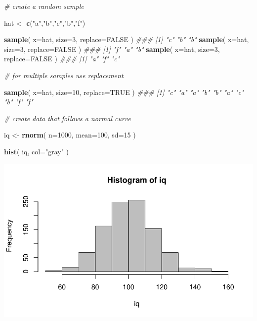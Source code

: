 \documentclass[]{book}
\newenvironment{Shaded}{\begin{snugshade}}{\end{snugshade}}
\newcommand{\CommentTok}[1]{\textcolor[rgb]{0.56,0.35,0.01}{\textit{#1}}}
\newcommand{\DataTypeTok}[1]{\textcolor[rgb]{0.13,0.29,0.53}{#1}}
\newcommand{\DecValTok}[1]{\textcolor[rgb]{0.00,0.00,0.81}{#1}}
\newcommand{\KeywordTok}[1]{\textcolor[rgb]{0.13,0.29,0.53}{\textbf{#1}}}
\newcommand{\NormalTok}[1]{#1}
\newcommand{\OtherTok}[1]{\textcolor[rgb]{0.56,0.35,0.01}{#1}}
\newcommand{\StringTok}[1]{\textcolor[rgb]{0.31,0.60,0.02}{#1}}
\theoremstyle{definition}
\theoremstyle{definition}
\theoremstyle{definition}
\theoremstyle{remark}
\begin{document}
\begin{Shaded}
\begin{Highlighting}[]
\CommentTok{# create a random sample}

\NormalTok{hat <-}\StringTok{ }\KeywordTok{c}\NormalTok{(}\StringTok{"a"}\NormalTok{,}\StringTok{"b"}\NormalTok{,}\StringTok{"c"}\NormalTok{,}\StringTok{"b"}\NormalTok{,}\StringTok{"f"}\NormalTok{)}

\KeywordTok{sample}\NormalTok{( }\DataTypeTok{x=}\NormalTok{hat, }\DataTypeTok{size=}\DecValTok{3}\NormalTok{, }\DataTypeTok{replace=}\OtherTok{FALSE}\NormalTok{ )}
\CommentTok{### [1] "c" "b" "b"}
\KeywordTok{sample}\NormalTok{( }\DataTypeTok{x=}\NormalTok{hat, }\DataTypeTok{size=}\DecValTok{3}\NormalTok{, }\DataTypeTok{replace=}\OtherTok{FALSE}\NormalTok{ )}
\CommentTok{### [1] "f" "a" "b"}
\KeywordTok{sample}\NormalTok{( }\DataTypeTok{x=}\NormalTok{hat, }\DataTypeTok{size=}\DecValTok{3}\NormalTok{, }\DataTypeTok{replace=}\OtherTok{FALSE}\NormalTok{ )}
\CommentTok{### [1] "a" "f" "c"}

\CommentTok{# for multiple samples use replacement}

\KeywordTok{sample}\NormalTok{( }\DataTypeTok{x=}\NormalTok{hat, }\DataTypeTok{size=}\DecValTok{10}\NormalTok{, }\DataTypeTok{replace=}\OtherTok{TRUE}\NormalTok{ )}
\CommentTok{###  [1] "c" "a" "a" "b" "b" "a" "c" "b" "f" "f"}





\CommentTok{# create data that follows a normal curve}

\NormalTok{iq <-}\StringTok{ }\KeywordTok{rnorm}\NormalTok{( }\DataTypeTok{n=}\DecValTok{1000}\NormalTok{, }\DataTypeTok{mean=}\DecValTok{100}\NormalTok{, }\DataTypeTok{sd=}\DecValTok{15}\NormalTok{ )}

\KeywordTok{hist}\NormalTok{( iq, }\DataTypeTok{col=}\StringTok{"gray"}\NormalTok{ )}
\end{Highlighting}
\end{Shaded}

\begin{center}\includegraphics[width=0.7\linewidth]{DS4PS-I_files/figure-latex/unnamed-chunk-74-1} \end{center}
\end{document}
